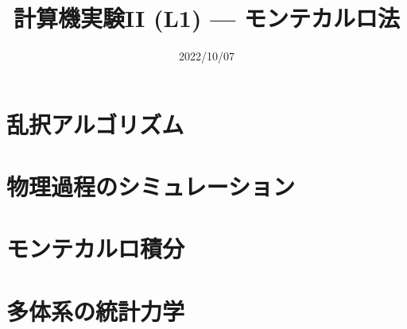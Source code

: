 \documentclass[10pt,dvipdfmx]{beamer}
\title{計算機実験II (L1) --- モンテカルロ法}
\date{2022/10/07}
\begin{document}
\begin{frame}
  \titlepage
  \tableofcontents
\end{frame}


% 

\section{乱択アルゴリズム}






\section{物理過程のシミュレーション}






\section{モンテカルロ積分}












\section{多体系の統計力学}
\end{document}
